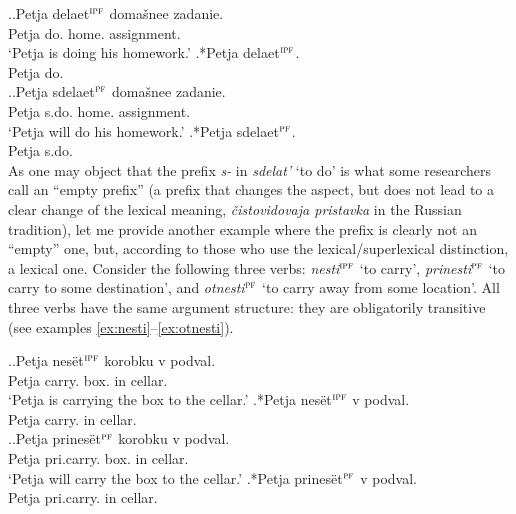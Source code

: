 \ex.\label{ex:delat}\ag.Petja delaet$^{\textsc{ipf}}$ doma\v{s}nee zadanie.\\
Petja do. home. assignment.\\
\trans `Petja is doing his homework.'
\bg.*Petja delaet$^{\textsc{ipf}}$.\\
Petja do.\\

\ex.\label{ex:sdelat}\ag.Petja sdelaet$^{\textsc{pf}}$ doma\v{s}nee zadanie.\\
Petja s.do. home. assignment.\\
\trans `Petja will do his homework.'
\bg.*Petja sdelaet$^{\textsc{pf}}$.\\
Petja s.do.\\


As one may object that the prefix \textit{s-} in \textit{sdelat'} `to do' is what some researchers call an ``empty prefix'' (a prefix that changes the aspect, but does not lead to a clear change of the lexical meaning, \textit{\v{c}istovidovaja pristavka} in the Russian tradition), let me provide another example where the prefix is clearly not an ``empty'' one, but, according to those who use the lexical/superlexical distinction, a lexical one.  Consider the following three verbs: \textit{nesti}$^{\textsc{ipf}}$ `to carry', \textit{prinesti}$^{\textsc{pf}}$ `to carry to some destination',  and \textit{otnesti}$^{\textsc{pf}}$ `to carry away from some location'. All three verbs have the same argument structure: they are obligatorily transitive (see examples \ref{ex:nesti}--\ref{ex:otnesti}).

\ex.\label{ex:nesti}\ag.Petja nes\"{e}t$^{\textsc{ipf}}$ korobku v podval.\\
Petja carry. box. in cellar.\\
\trans `Petja is carrying the box to the cellar.'
\bg.*Petja nes\"{e}t$^{\textsc{ipf}}$ v podval.\\
Petja carry. in cellar.\\

\ex.\label{ex:prinesti}\ag.Petja prines\"{e}t$^{\textsc{pf}}$ korobku v podval.\\
Petja pri.carry. box. in cellar.\\
\trans `Petja will carry the box to the cellar.'
\bg.*Petja prines\"{e}t$^{\textsc{pf}}$ v podval.\\
Petja pri.carry. in cellar.\\

